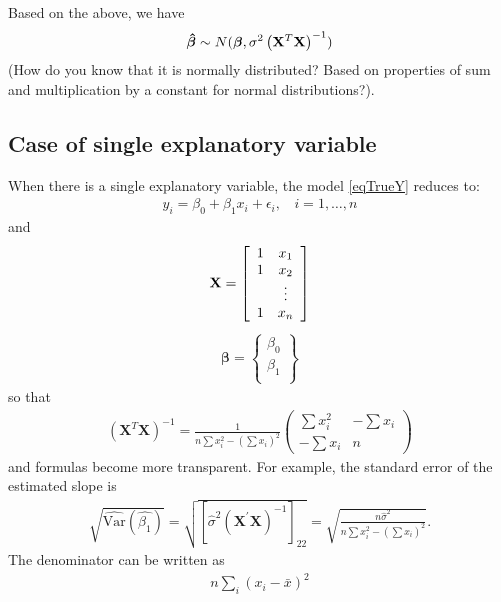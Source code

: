 \documentclass[11pt]{article}
\theoremstyle{remark}
\begin{document}
Based on the above, we have
\begin{eqnarray}
\boldsymbol{\hat{\beta}}\sim N(\boldsymbol{\beta},\sigma^2 \left(\bold{X}^T\bold{X}\right)^{-1})
\label{NormallyDistributedBetaHat}
\end{eqnarray}
(How do you know that it is normally distributed? Based on properties of sum and multiplication by a constant for normal distributions?).

\subsection{Case of single explanatory variable}
When there is a single explanatory variable, the model \eqref{eqTrueY} reduces to:
\begin{eqnarray}
y_i = \beta_0 + \beta_1 x_i + \epsilon_i,\:\:\:\:i = 1,\hdots,n
\end{eqnarray}
and 
\begin{eqnarray}
\bold{X} =
\left[
\begin{array}{cc}
1 & x_1\\
1 & x_2\\
  & \vdots\\
1 & x_n
\end{array}
\right]
\end{eqnarray}
\begin{eqnarray}
\boldsymbol{\beta} =
\left\{
\begin{array}{c}
\beta_0\\
\beta_1\\
\end{array}
\right\}
\end{eqnarray}
so that
\begin{eqnarray}
(\mathbf{X}^T \mathbf{X})^{-1} = \frac{1}{n\sum x_i^2 - (\sum x_i)^2}
\left(
\begin{array}{cc}
\sum x_i^2 & -\sum x_i \\
-\sum x_i  & n
\end{array}
\right)
\end{eqnarray}
and formulas become more transparent. For example, the standard error of the estimated slope is 
\begin{eqnarray}
\sqrt{\widehat{\textrm{Var}}(\hat{\beta_1})} = \sqrt{[\hat{\sigma}^2  (\mathbf{X}^{\prime} \mathbf{X})^{-1}]_{22}} = \sqrt{\frac{n \hat{\sigma}^2}{n\sum x_i^2 - (\sum x_i)^2}}.
\end{eqnarray}
The denominator can be written as
\begin{eqnarray}
n \sum_i (x_i - \bar{x})^2
\end{eqnarray}
\end{document}
